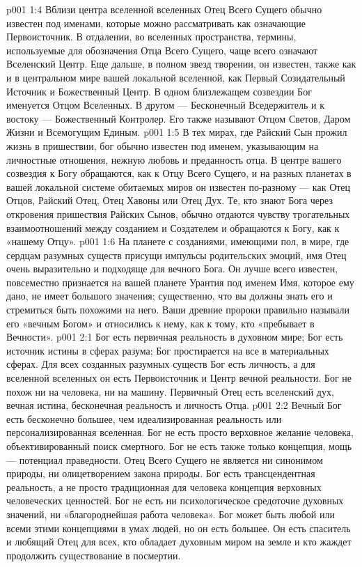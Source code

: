 \vs p001 1:4 \pc Вблизи центра вселенной вселенных Отец Всего Сущего обычно известен под именами, которые можно рассматривать как означающие Первоисточник. В отдалении, во вселенных пространства, термины, используемые для обозначения Отца Всего Сущего, чаще всего означают Вселенский Центр. Еще дальше, в полном звезд творении, он известен, также как и в центральном мире вашей локальной вселенной, как Первый Созидательный Источник и Божественный Центр. В одном близлежащем созвездии Бог именуется Отцом Вселенных. В другом --- Бесконечный Вседержитель и к востоку --- Божественный Контролер. Его также называют Отцом Светов, Даром Жизни и Всемогущим Единым.
\vs p001 1:5 В тех мирах, где Райский Сын прожил жизнь в пришествии, бог обычно известен под именем, указывающим на личностные отношения, нежную любовь и преданность отца. В центре вашего созвездия к Богу обращаются, как к Отцу Всего Сущего, и на разных планетах в вашей локальной системе обитаемых миров он известен по\hyp{}разному --- как Отец Отцов, Райский Отец, Отец Хавоны или Отец Дух. Те, кто знают Бога через откровения пришествия Райских Сынов, обычно отдаются чувству трогательных взаимоотношений между созданием и Создателем и обращаются к Богу, как к «нашему Отцу».
\vs p001 1:6 На планете с созданиями, имеющими пол, в мире, где сердцам разумных существ присущи импульсы родительских эмоций, имя Отец очень выразительно и подходяще для вечного Бога. Он лучше всего известен, повсеместно признается на вашей планете Урантия под именем  Имя, которое ему дано, не имеет большого значения; существенно, что вы должны знать его и стремиться быть похожими на него. Ваши древние пророки правильно называли его «вечным Богом» и относились к нему, как к тому, кто «пребывает в Вечности».
\vs p001 2:1 Бог есть первичная реальность в духовном мире; Бог есть источник истины в сферах разума; Бог простирается на все в материальных сферах. Для всех созданных разумных существ Бог есть личность, а для вселенной вселенных он есть Первоисточник и Центр вечной реальности. Бог не похож ни на человека, ни на машину. Первичный Отец есть вселенский дух, вечная истина, бесконечная реальность и личность Отца.
\vs p001 2:2 \pc Вечный Бог есть бесконечно большее, чем идеализированная реальность или персонализированная вселенная. Бог не есть просто верховное желание человека, объективированный поиск смертного. Бог не есть также только концепция, мощь --- потенциал праведности. Отец Всего Сущего не является ни синонимом природы, ни олицетворением закона природы. Бог есть трансцендентная реальность, а не просто традиционная для человека концепция верховных человеческих ценностей. Бог не есть ни психологическое средоточие духовных значений, ни «благороднейшая работа человека». Бог может быть любой или всеми этими концепциями в умах людей, но он есть большее. Он есть спаситель и любящий Отец для всех, кто обладает духовным миром на земле и кто жаждет продолжить существование в посмертии.
